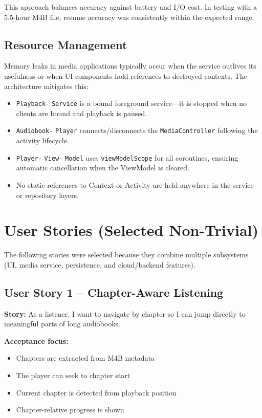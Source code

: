 \documentclass[11pt,a4paper]{article}
\begin{document}
This approach balances accuracy against battery and I/O cost. In testing with a 5.5-hour M4B file, resume accuracy was consistently within the expected range.

\subsection{Resource Management}

Memory leaks in media applications typically occur when the service outlives its usefulness or when UI components hold references to destroyed contexts. The architecture mitigates this:

\begin{itemize}[noitemsep]
    \item \texttt{Playback-} \texttt{Service} is a bound foreground service---it is stopped when no clients are bound and playback is paused.
    \item \texttt{Audiobook-} \texttt{Player} connects/disconnects the \texttt{MediaController} following the activity lifecycle.
    \item \texttt{Player-} \texttt{View-} \texttt{Model} uses \texttt{viewModelScope} for all coroutines, ensuring automatic cancellation when the ViewModel is cleared.
    \item No static references to Context or Activity are held anywhere in the service or repository layers.
\end{itemize}

\section{User Stories (Selected Non-Trivial)}

The following stories were selected because they combine multiple subsystems (UI, media service, persistence, and cloud/backend features).

\subsection{User Story 1 -- Chapter-Aware Listening}

\textbf{Story:} As a listener, I want to navigate by chapter so I can jump directly to meaningful parts of long audiobooks.

\textbf{Acceptance focus:}
\begin{itemize}[noitemsep]
    \item Chapters are extracted from M4B metadata
    \item The player can seek to chapter start
    \item Current chapter is detected from playback position
    \item Chapter-relative progress is shown
\end{itemize}
\end{document}
